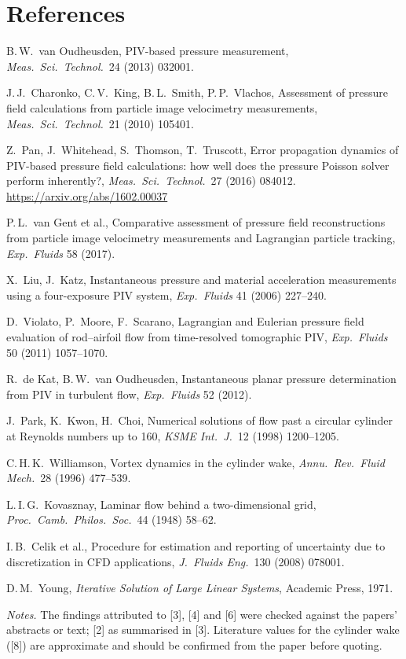 \chapter*{References}
\begin{enumerate}[label={[\arabic*]},leftmargin=*]
\item B.\,W.\ van Oudheusden, PIV-based pressure measurement, \emph{Meas.\ Sci.\ Technol.}\ 24 (2013) 032001.
\item J.\,J.\ Charonko, C.\,V.\ King, B.\,L.\ Smith, P.\,P.\ Vlachos, Assessment of pressure field calculations from particle image velocimetry measurements, \emph{Meas.\ Sci.\ Technol.}\ 21 (2010) 105401.
\item Z.\ Pan, J.\ Whitehead, S.\ Thomson, T.\ Truscott, Error propagation dynamics of PIV-based pressure field calculations: how well does the pressure Poisson solver perform inherently?, \emph{Meas.\ Sci.\ Technol.}\ 27 (2016) 084012. \url{https://arxiv.org/abs/1602.00037}
\item P.\,L.\ van Gent et al., Comparative assessment of pressure field reconstructions from particle image velocimetry measurements and Lagrangian particle tracking, \emph{Exp.\ Fluids} 58 (2017).
\item X.\ Liu, J.\ Katz, Instantaneous pressure and material acceleration measurements using a four-exposure PIV system, \emph{Exp.\ Fluids} 41 (2006) 227--240.
\item D.\ Violato, P.\ Moore, F.\ Scarano, Lagrangian and Eulerian pressure field evaluation of rod--airfoil flow from time-resolved tomographic PIV, \emph{Exp.\ Fluids} 50 (2011) 1057--1070.
\item R.\ de Kat, B.\,W.\ van Oudheusden, Instantaneous planar pressure determination from PIV in turbulent flow, \emph{Exp.\ Fluids} 52 (2012).
\item J.\ Park, K.\ Kwon, H.\ Choi, Numerical solutions of flow past a circular cylinder at Reynolds numbers up to 160, \emph{KSME Int.\ J.}\ 12 (1998) 1200--1205.
\item C.\,H.\,K.\ Williamson, Vortex dynamics in the cylinder wake, \emph{Annu.\ Rev.\ Fluid Mech.}\ 28 (1996) 477--539.
\item L.\,I.\,G.\ Kovasznay, Laminar flow behind a two-dimensional grid, \emph{Proc.\ Camb.\ Philos.\ Soc.}\ 44 (1948) 58--62.
\item I.\,B.\ Celik et al., Procedure for estimation and reporting of uncertainty due to discretization in CFD applications, \emph{J.\ Fluids Eng.}\ 130 (2008) 078001.
\item D.\,M.\ Young, \emph{Iterative Solution of Large Linear Systems}, Academic Press, 1971.
\end{enumerate}
\textit{Notes.} The findings attributed to [3], [4] and [6] were checked against the papers' abstracts or text; [2] as summarised in [3]. Literature values for the cylinder wake ([8]) are approximate and should be confirmed from the paper before quoting.

